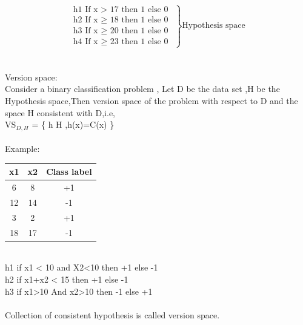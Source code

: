 $$
 \left.
    \begin{array}{ll}
  \mbox{h1 If  x  > 17 then 1 else 0 }        \\
  \mbox{h2  If  x $\geq$ 18 then 1 else 0 }     \\
  \mbox{h3 If  x $\geq$  20 then 1 else 0}      \\
  \mbox{h4 If  x  $\geq$ 23 then 1 else 0}
  \end{array}
\right \}\mbox{Hypothesis space}
$$
\\
\\
Version space:
\\
Consider a binary classification problem ,
Let D be the data set ,H be the Hypothesis space,Then version space of the problem with respect to D and the space H consistent with D,i.e,\\
VS$_{D,H}$ = \{ h \in  H ,h(x)=C(x) \}\\
\\
Example:
 \begin{table}[h]                           
 \centering
    \begin{tabular}{|c|c|c|}
    \hline
  x1    &  x2 &    Class label            \\ \hline
  6      &   8    & +1         \\ \hline          
     12    &  14  & -1 \\ \hline
      3   &   2   & +1      \\ \hline
     18    &   17 & -1        \\ \hline

    \end{tabular}
    \label{tab:msg1}                            

\end{table}\\

h1 if  x1 < 10 and X2<10  then +1 else -1\\
h2 if x1+x2 < 15 then +1 else -1\\
h3 if x1>10 And  x2>10 then -1 else +1\\
\\
Collection of consistent hypothesis is called version space.